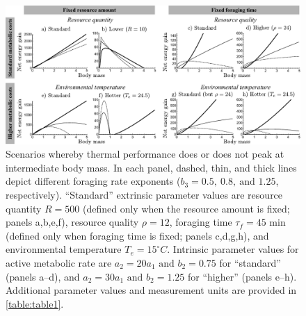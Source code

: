 \begin{figure}
\includegraphics[width=\textwidth]{fig2}
\caption{
    \setstretch{\stretchby}
    Scenarios whereby thermal performance does or does not peak at intermediate body mass.
    In each panel, dashed, thin, and thick lines depict different foraging rate exponents ($b_3 = 0.5,\ 0.8,\ \text{and } 1.25$, respectively).
    ``Standard'' extrinsic parameter values are
    resource quantity $R = 500$ (defined only when the resource amount is fixed; panels a,b,e,f),
    resource quality $\rho = 12$,
    foraging time $\tau_f = 45 \text{ min}$ (defined only when foraging time is fixed; panels c,d,g,h),
    and environmental temperature $T_e = 15^\circ C$.
    Intrinsic parameter values for active metabolic rate are $a_2 = 20 a_1 \text{ and } b_2 = 0.75$ for ``standard'' (panels a--d), and $a_2 = 30 a_1 \text{ and } b_2  = 1.25$ for ``higher'' (panels e--h).
    Additional parameter values and measurement units are provided in \cref{table:table1}.
}
\label{fig2}
\end{figure}

